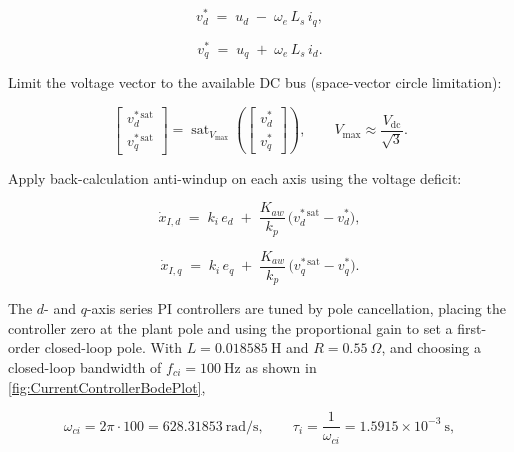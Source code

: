 \begin{equation}
	\label{eq:cur-vdcmd}
	v_d^{\ast} \;=\; u_d \;-\; \omega_e\, L_s\, i_q ,
\end{equation}

\begin{equation}
	\label{eq:cur-vqcmd}
	v_q^{\ast} \;=\; u_q \;+\; \omega_e\, L_s\, i_d .
\end{equation}





Limit the voltage vector to the available DC bus (space-vector circle limitation):

\begin{equation}
	\label{eq:cur-sat}
	\begin{bmatrix} v_d^{\ast\,\mathrm{sat}} \\[2pt] v_q^{\ast\,\mathrm{sat}} \end{bmatrix}
	= \operatorname{sat}_{V_{\max}}\!\left( \begin{bmatrix} v_d^{\ast} \\ v_q^{\ast} \end{bmatrix} \right) ,
	\qquad V_{\max} \approx \frac{V_{\mathrm{dc}}}{\sqrt{3}} .
\end{equation}

Apply back-calculation anti-windup on each axis using the voltage deficit:

\begin{equation}
	\label{eq:cur-aw-d}
	\dot{x}_{I,d} \;=\; k_i\, e_d \;+\; \frac{K_{aw}}{k_p}\,\big( v_d^{\ast\,\mathrm{sat}} - v_d^{\ast} \big) ,
\end{equation}

\begin{equation}
	\label{eq:cur-aw-q}
	\dot{x}_{I,q} \;=\; k_i\, e_q \;+\; \frac{K_{aw}}{k_p}\,\big( v_q^{\ast\,\mathrm{sat}} - v_q^{\ast} \big) .
\end{equation}





The $d$- and $q$-axis series PI controllers are tuned by pole cancellation, placing the controller zero at the plant pole and using the proportional gain to set a first-order closed-loop pole. With $L=0.018585~\mathrm{H}$ and $R = 0.55~\Omega$, and choosing a closed-loop bandwidth of $f_{ci}=100~\mathrm{Hz}$ as shown in \ref{fig:CurrentControllerBodePlot},

\begin{equation}
	\label{eq:cur-wci-num}
	\omega_{ci} = 2\pi\cdot 100 = 628.31853~\text{rad/s}, \qquad \tau_i=\frac{1}{\omega_{ci}}=1.5915\times 10^{-3}~\text{s},
\end{equation}

